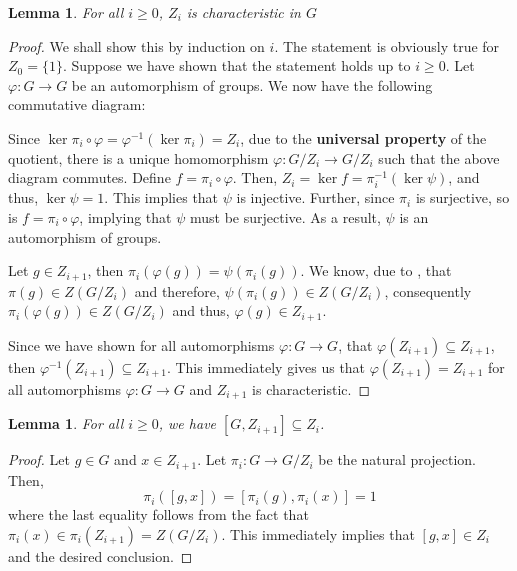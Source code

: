 \documentclass[12pt]{article}
\theoremstyle{thmstyle}
\newtheorem{lemma}[theorem]{Lemma}
\theoremstyle{defstyle}
\renewcommand{\ge}{\geqslant}
\begin{document}
\begin{lemma}
    For all $i\ge0$, $Z_i$ is characteristic in $G$
\end{lemma}
\begin{proof}
    We shall show this by induction on $i$. The statement is obviously true for $Z_0 = \{1\}$. Suppose we have shown that the statement holds up to $i\ge0$. Let $\varphi: G\to G$ be an automorphism of groups. We now have the following commutative diagram: 

    \begin{center}
    \end{center}

    Since $\ker\pi_i\circ\varphi = \varphi^{-1}(\ker\pi_i) = Z_i$, due to the \textbf{universal property} of the quotient, there is a unique homomorphism $\varphi: G/Z_i\to G/Z_i$ such that the above diagram commutes. Define $f = \pi_i\circ\varphi$. Then, $Z_i = \ker f = \pi_i^{-1}(\ker\psi)$, and thus, $\ker\psi = 1$. This implies that $\psi$ is injective. Further, since $\pi_i$ is surjective, so is $f = \pi_i\circ\varphi$, implying that $\psi$ must be surjective. As a result, $\psi$ is an automorphism of groups.

    Let $g\in Z_{i + 1}$, then $\pi_i(\varphi(g)) = \psi(\pi_i(g))$. We know, due to , that $\pi(g)\in Z(G/Z_i)$ and therefore, $\psi(\pi_i(g))\in Z(G/Z_i)$, consequently $\pi_i(\varphi(g))\in Z(G/Z_i)$ and thus, $\varphi(g)\in Z_{i + 1}$.

    Since we have shown for all automorphisms $\varphi: G\to G$, that $\varphi(Z_{i + 1})\subseteq Z_{i + 1}$, then $\varphi^{-1}(Z_{i + 1})\subseteq Z_{i + 1}$. This immediately gives us that $\varphi(Z_{i + 1}) = Z_{i + 1}$ for all automorphisms $\varphi: G\to G$ and $Z_{i + 1}$ is characteristic.
\end{proof}

\begin{lemma}
    For all $i\ge 0$, we have $[G,Z_{i + 1}]\subseteq Z_i$.
\end{lemma}
\begin{proof}
    Let $g\in G$ and $x\in Z_{i + 1}$. Let $\pi_i: G\to G/Z_i$ be the natural projection. Then, 
    \begin{equation*}
        \pi_i([g,x]) = [\pi_i(g), \pi_i(x)] = 1
    \end{equation*}
    where the last equality follows from the fact that $\pi_i(x)\in\pi_i(Z_{i + 1}) = Z(G/Z_i)$. This immediately implies that $[g,x]\in Z_i$ and the desired conclusion.
\end{proof}
\end{document}
